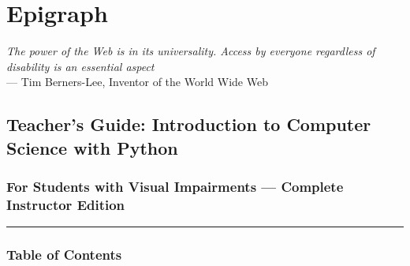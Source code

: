 \documentclass[
  justified,
  openright,
]{tufte-book}
\begin{document}
\chapter*{Epigraph}
\thispagestyle{empty}
\begin{flushright}
  \vspace*{0.25\textheight}
  {\itshape The power of the Web is in its universality. Access by everyone regardless of disability is an essential aspect}\\[1em]
  --- Tim Berners-Lee, Inventor of the World Wide Web
\end{flushright}
\clearpage

\newpage

\mainmatter
{} %


\section{Teacher's Guide: Introduction to Computer Science with
Python}\label{teachers-guide-introduction-to-computer-science-with-python}

\subsection{For Students with Visual Impairments --- Complete Instructor
Edition}\label{for-students-with-visual-impairments-complete-instructor-edition}

\begin{center}\rule{0.5\linewidth}{0.5pt}\end{center}

\subsection{Table of Contents}\label{table-of-contents}
\end{document}
